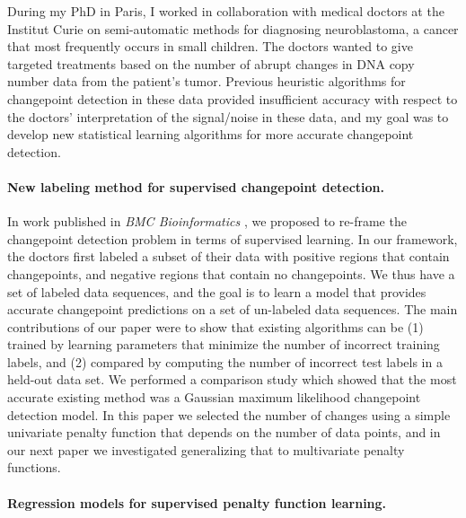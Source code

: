\documentclass{article}
\begin{document}
During my PhD in Paris, I worked in collaboration with medical doctors
at the Institut Curie on semi-automatic methods for diagnosing
neuroblastoma, a cancer that most frequently occurs in small
children. The doctors wanted to give targeted treatments based on the
number of abrupt changes in DNA copy number data from the patient's
tumor. Previous heuristic algorithms for changepoint detection in
these data provided insufficient accuracy with respect to the doctors'
interpretation of the signal/noise in these data, and my goal was to
develop new statistical learning algorithms for more accurate
changepoint detection.

\paragraph{New labeling method for supervised changepoint detection.}

In work published in \emph{BMC Bioinformatics}
\citep{HOCKING-breakpoints}, we proposed to re-frame the changepoint
detection problem in terms of supervised learning. In our framework,
the doctors first labeled a subset of their data with positive regions
that contain changepoints, and negative regions that contain no
changepoints. We thus have a set of labeled data sequences, and the
goal is to learn a model that provides accurate changepoint predictions
on a set of un-labeled data sequences. The main contributions of our
paper were to show that existing algorithms can be (1) trained by
learning parameters that minimize the number of
incorrect training labels, and (2) compared by computing the number of
incorrect test labels in a held-out data set. We performed a
comparison study which showed that the most accurate existing method
was a Gaussian maximum likelihood changepoint detection model. 
In this paper we selected the number of changes using a
simple univariate penalty function that depends on the number of data
points, and in our next paper we investigated generalizing that to
multivariate penalty functions.

\paragraph{Regression models for supervised penalty function
  learning.}
\end{document}
